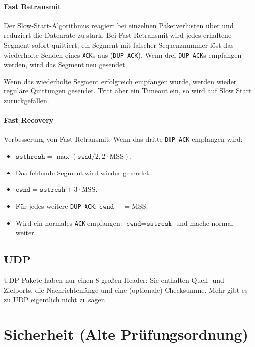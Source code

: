 \documentclass[a4paper,parskip=half*,DIV=15,fontsize=11pt]{scrartcl}
\begin{document}
\paragraph{Fast Retransmit}

Der Slow-Start-Algorithmus reagiert bei einzelnen Paketverlusten über und reduziert die Datenrate zu stark. Bei Fast Retransmit wird jedes erhaltene Segment sofort quittiert; ein Segment mit falscher Sequenznummer löst das wiederholte Senden eines \lstinline{ACK}s aus (\lstinline{DUP-ACK}). Wenn drei \lstinline{DUP-ACK}s empfangen werden, wird das Segment neu gesendet.

Wenn das wiederholte Segment erfolgreich empfangen wurde, werden wieder reguläre Quittungen gesendet. Tritt aber ein Timeout ein, so wird auf Slow Start zurückgefallen.

\paragraph{Fast Recovery}

Verbesserung von Fast Retransmit. Wenn das dritte \lstinline{DUP-ACK} empfangen wird:

\begin{itemize}
\item $\texttt{ssthresh} = \max(\texttt{swnd}/2, 2 \cdot \mathrm{MSS})$.
\item Das fehlende Segment wird wieder gesendet.
\item $\texttt{cwnd} = \texttt{sstresh} + 3 \cdot \mathrm{MSS}$.
\item Für jedes weitere \lstinline{DUP-ACK}: $\texttt{cwnd} \mathrel{+}= \mathrm{MSS}$.
\item Wird ein normales \lstinline{ACK} empfangen: $\texttt{cwnd} = \texttt{sstresh}$ und mache normal weiter.
\end{itemize}

\subsection{UDP}

UDP-Pakete haben nur einen \SI{8}{\byte} großen Header: Sie enthalten Quell- und Zielports, die Nachrichtenlänge und eine (optionale) Checksumme. Mehr gibt es zu UDP eigentlich nicht zu sagen.

\section{Sicherheit (Alte Prüfungsordnung)}
\end{document}
